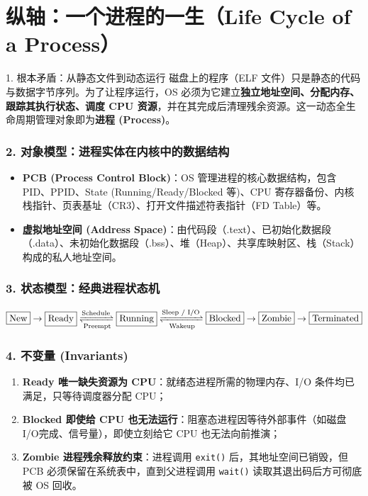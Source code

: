 \documentclass[11pt,a4paper,openany]{ctexbook}
\newcommand{\key}[1]{\textbf{\color{deep}#1}}
\begin{document}
\section{纵轴：一个进程的一生（Life Cycle of a Process）}

\begin{corebox}{1. 根本矛盾：从静态文件到动态运行}
磁盘上的程序（ELF 文件）只是静态的代码与数据字节序列。为了让程序运行，OS 必须为它建立\textbf{独立地址空间、分配内存、跟踪其执行状态、调度 CPU 资源}，并在其完成后清理残余资源。这一动态全生命周期管理对象即为\key{进程 (Process)}。
\end{corebox}

\subsubsection*{2. 对象模型：进程实体在内核中的数据结构}
\begin{itemize}
  \item \key{PCB (Process Control Block)}：OS 管理进程的核心数据结构，包含 PID、PPID、State (Running/Ready/Blocked 等)、CPU 寄存器备份、内核栈指针、页表基址（CR3）、打开文件描述符表指针（FD Table）等。
  \item \key{虚拟地址空间 (Address Space)}：由代码段（.text）、已初始化数据段（.data）、未初始化数据段（.bss）、堆（Heap）、共享库映射区、栈（Stack）构成的私人地址空间。
\end{itemize}

\subsubsection*{3. 状态模型：经典进程状态机}
\[
\boxed{\text{New}} \rightarrow \boxed{\text{Ready}} \xrightleftharpoons[\text{Preempt}]{\text{Schedule}} \boxed{\text{Running}} \xrightleftharpoons[\text{Wakeup}]{\text{Sleep / I/O}} \boxed{\text{Blocked}} \rightarrow \boxed{\text{Zombie}} \rightarrow \boxed{\text{Terminated}}
\]

\subsubsection*{4. 不变量 (Invariants)}
\begin{enumerate}
  \item \key{Ready 唯一缺失资源为 CPU}：就绪态进程所需的物理内存、I/O 条件均已满足，只等待调度器分配 CPU；
  \item \key{Blocked 即使给 CPU 也无法运行}：阻塞态进程因等待外部事件（如磁盘 I/O完成、信号量），即使立刻给它 CPU 也无法向前推演；
  \item \key{Zombie 进程残余释放约束}：进程调用 \texttt{exit()} 后，其地址空间已销毁，但 PCB 必须保留在系统表中，直到父进程调用 \texttt{wait()} 读取其退出码后方可彻底被 OS 回收。
\end{enumerate}
\end{document}
